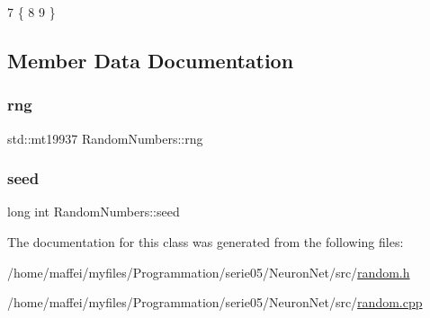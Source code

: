 \begin{DoxyCode}
7                                                                    \{
8     
9 \}
\end{DoxyCode}


\subsection{Member Data Documentation}
\mbox{\label{classRandomNumbers_a15ceee85d6d00de12ae76c90aaec2f14}} 
\subsubsection{\texorpdfstring{rng}{rng}}
{\footnotesize\ttfamily std\+::mt19937 Random\+Numbers\+::rng\hspace{0.3cm}{\ttfamily [private]}}

\mbox{\label{classRandomNumbers_a83c563bc5ca60f2e5c149244b327d948}} 
\subsubsection{\texorpdfstring{seed}{seed}}
{\footnotesize\ttfamily long int Random\+Numbers\+::seed\hspace{0.3cm}{\ttfamily [private]}}



The documentation for this class was generated from the following files\+:\begin{DoxyCompactItemize}
\item 
/home/maffei/myfiles/\+Programmation/serie05/\+Neuron\+Net/src/\hyperlink{random_8h}{random.\+h}\item 
/home/maffei/myfiles/\+Programmation/serie05/\+Neuron\+Net/src/\hyperlink{random_8cpp}{random.\+cpp}\end{DoxyCompactItemize}
